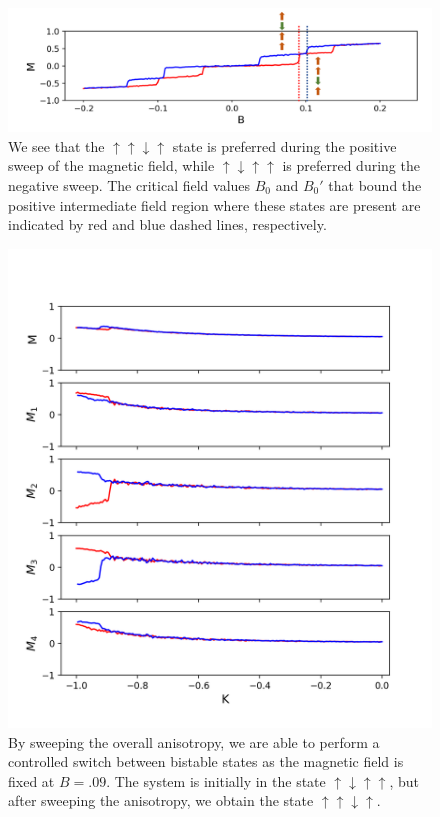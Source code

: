 \documentclass[10pt]{article}
\begin{document}
\begin{figure}[!htb]

  \includegraphics[width=\textwidth]{bistable_switch.png}

\caption{We see that the $\uparrow \uparrow \downarrow \uparrow$ state is preferred during the positive sweep of the magnetic field, while  $\uparrow \downarrow \uparrow  \uparrow$ is preferred during the negative sweep. The critical field values $B_{0}$ and $B_{0}'$ that
bound the positive intermediate field region where these states are present are indicated by red and blue dashed lines, respectively. }
\end{figure}

\begin{figure}[!htb]

  \includegraphics[width=\textwidth]{switch_states.png}

\caption{By sweeping the overall anisotropy, we are able to perform a controlled switch between bistable states as the magnetic field is fixed at $B = .09$. The system is initially in the state
$\uparrow \downarrow \uparrow \uparrow$, but after sweeping the anisotropy, we obtain the state $\uparrow \uparrow  \downarrow \uparrow$. }
\end{figure}
\end{document}
